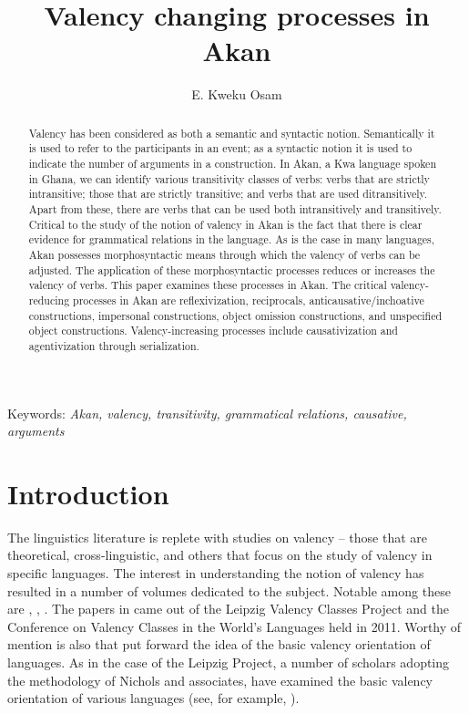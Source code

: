 \documentclass[output=paper]{langsci/langscibook}
\title{Valency changing processes in {Akan}}
\author{%
E. Kweku Osam\affiliation{University of Ghana} 
}
\begin{document}
\begin{abstract}
Valency has been considered as both a semantic and syntactic notion. Semantically it is used to refer to the participants in an event; as a syntactic notion it is used to indicate the number of arguments in a construction. In Akan, a Kwa language spoken in Ghana, we can identify various transitivity classes of verbs: verbs that are strictly intransitive; those that are strictly transitive; and verbs that are used ditransitively. Apart from these, there are verbs that can be used both intransitively and transitively. Critical to the study of the notion of valency in Akan is the fact that there is clear evidence for grammatical relations in the language. As is the case in many languages, Akan possesses morphosyntactic means through which the valency of verbs can be adjusted. The application of these morphosyntactic processes reduces or increases the valency of verbs. This paper examines these processes in Akan. The critical valency-reducing processes in Akan are reflexivization, reciprocals, anticausative/inchoative constructions, impersonal constructions, object omission constructions, and unspecified object constructions. Valency-increasing processes include causativization and agentivization through serialization.
\end{abstract}

Keywords: \textit{Akan, valency, transitivity, grammatical relations, causative, arguments}

\section{Introduction}\label{§1:introduction.osam}

The linguistics literature is replete with studies on valency -- those that are theoretical, cross-linguistic, and others that focus on the study of valency in specific languages. The interest in understanding the notion of valency has resulted in a number of volumes dedicated to the subject. Notable among these are \citet{comriepolinsky1993}, \citet{dixonaikhenvald2000a}, \citet{malchukovcomrieinpress}. The papers in \citet{malchukovcomrieinpress} came out of the Leipzig Valency Classes Project and the Conference on Valency Classes in the World's Languages held in 2011. Worthy of mention is also \citet{nicholsetal2004} that put forward the idea of the basic valency orientation of languages. As in the case of the Leipzig Project, a number of scholars adopting the methodology of Nichols and associates, have examined the basic valency orientation of various languages (see, for example, \citealt{narogg2009,planklahiri2009,vangelderen2011,luraghi2012}).  
\end{document}
